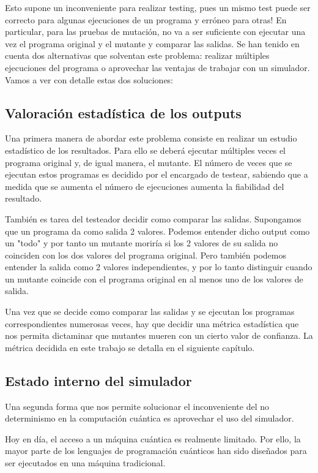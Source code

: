 Esto supone un inconveniente para realizar testing, pues un mismo test puede ser correcto para algunas ejecuciones de un programa y erróneo para otras! En particular, para las pruebas de mutación, no va a ser suficiente con ejecutar una vez el programa original y el mutante y comparar las salidas. Se han tenido en cuenta dos alternativas que solventan este problema: realizar múltiples ejecuciones del programa o aprovechar las ventajas de trabajar con un simulador. Vamos a ver con detalle estas dos soluciones:

\subsection{Valoración estadística de los outputs}

Una primera manera de abordar este problema consiste en realizar un estudio estadístico de los resultados. Para ello se deberá ejecutar múltiples veces el programa original y, de igual manera, el mutante. El número de veces que se ejecutan estos programas es decidido por el encargado de testear, sabiendo que a medida que se aumenta el número de ejecuciones aumenta la fiabilidad del resultado. 

También es tarea del testeador decidir como comparar las salidas. Supongamos que un programa da como salida 2 valores. Podemos entender dicho output como un "todo" y por tanto un mutante moriría si los 2 valores de su salida no coinciden con los dos valores del programa original. Pero también podemos entender la salida como 2 valores independientes, y por lo tanto distinguir cuando un mutante coincide con el programa original en al menos uno de los valores de salida.

Una vez que se decide como comparar las salidas y se ejecutan los programas correspondientes numerosas veces, hay que decidir una métrica estadística que nos permita dictaminar que mutantes mueren con un cierto valor de confianza. La métrica decidida en este trabajo se detalla en el siguiente capítulo.

\subsection{Estado interno del simulador}

Una segunda forma que nos permite solucionar el inconveniente del no determinismo en la computación cuántica es aprovechar el uso del simulador.

Hoy en día, el acceso a un máquina cuántica es realmente limitado. Por ello, la mayor parte de los lenguajes de programación cuánticos han sido diseñados para ser ejecutados en una máquina
tradicional.

